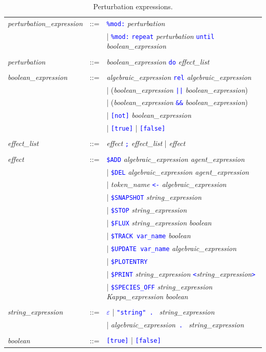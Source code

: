 \documentclass[11pt]{book}
\def\tcb#1{\textcolor{blue}{\ttt{#1}}}
\def\ttt#1{\texttt{#1}}
\def\var#1{{\textquotesingle}#1{\textquotesingle}}
\begin{document}
\begin{table}[htbp]
  \centering
  \caption{Perturbation expressions.}
  \begin{tabular}{@{} lcl @{}}
  	\textit{perturbation\_expression} &::=& \tcb{\ttt{\%mod:}} \textit{perturbation} \\
	&& | \tcb{\ttt{\%mod:}} \tcb{\ttt{repeat}} \textit{perturbation} \tcb{\ttt{until}} \textit{boolean\_expression} \\\\

    \textit{perturbation} &::=& \textit{boolean\_expression} \tcb{\ttt{do}} \textit{effect\_list} \\\\
    \textit{boolean\_expression} &::=& \textit{algebraic\_expression}\index{boolean expression} \tcb{rel} \textit{algebraic\_expression} \\
    && | (\textit{boolean\_expression} \tcb{||} \textit{boolean\_expression}) \\
    && | (\textit{boolean\_expression} \tcb{\&\&} \textit{boolean\_expression}) \\
    && | \tcb{[not]} \textit{boolean\_expression} \\
    && | \tcb{[true]} | \tcb{[false]} \\\\
    \textit{effect\_list} &::=& \textit{effect} \tcb{\ttt {;}} \textit{effect\_list} | \textit{effect} \\\\
\textit{effect} &::=& \tcb{\$ADD} \textit{algebraic\_expression agent\_expression} \\
    && | \tcb{\$DEL} \textit{algebraic\_expression agent\_expression} \\
    && | \textit{token\_name} \tcb{<-} \textit{algebraic\_expression} \\
    && | \tcb{\$SNAPSHOT} \textit{string\_expression}\\
    && | \tcb{\$STOP} \textit{string\_expression}\\
	&& | \tcb{\$FLUX} \textit{string\_expression} \textit{boolean} \\
    && | \tcb{\$TRACK \var{var\_name}} \textit{boolean} \\
    && | \tcb{\$UPDATE \var{var\_name}} \textit{algebraic\_expression} \\
    && | \tcb{\$PLOTENTRY} \\
    && | \tcb{\$PRINT} \textit{string\_expression} \tcb{<}\textit{string\_expression}\tcb{>} \\
    && | \tcb{\$SPECIES\_OFF} \textit{string\_expression} \textit{Kappa\_expression} \textit{boolean} \\
    \\
    \textit{string\_expression} &::=& \tcb{$\varepsilon$} | \tcb{"string" . } \textit{string\_expression} \\
    && | \textit{algebraic\_expression}\tcb{ . } \textit{string\_expression} \\\\
	\textit{boolean} &::=& \tcb{[true]} | \tcb{[false]}
  \end{tabular}
  \label{tab:pert}
\end{table}
\end{document}
